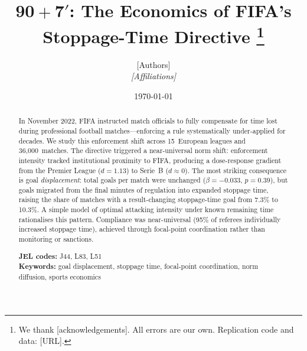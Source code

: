 \documentclass[12pt]{article}
\title{\textbf{$\boldsymbol{90{+}7'}$: The Economics of
FIFA's Stoppage-Time Directive}%
\thanks{We thank [acknowledgements]. All errors are our own.
Replication code and data: [URL].}}
\author{[Authors]\\[4pt]\textit{[Affiliations]}}
\date{\today}
\begin{document}
\maketitle


\begin{abstract}
\noindent
In November 2022, FIFA instructed match officials to fully compensate
for time lost during professional football matches---enforcing a rule
systematically under-applied for decades. We study this enforcement
shift across 15~European leagues and 36,000~matches. The directive
triggered a near-universal norm shift: enforcement intensity tracked
institutional proximity to FIFA, producing a dose-response gradient
from the Premier League ($d = 1.13$) to Serie~B ($d \approx 0$).
The most striking consequence is goal \textit{displacement}: total
goals per match were unchanged ($\beta = -0.033$, $p = 0.39$), but
goals migrated from the final minutes of regulation into expanded
stoppage time, raising the share of matches with a result-changing
stoppage-time goal from 7.3\% to 10.3\%. A simple model of optimal
attacking intensity under known remaining time rationalises this
pattern. Compliance was near-universal (95\% of referees individually
increased stoppage time), achieved through focal-point coordination
rather than monitoring or sanctions.

\medskip
\noindent
\textbf{JEL codes:} J44, L83, L51 \\
\textbf{Keywords:} goal displacement, stoppage time, focal-point
coordination, norm diffusion, sports economics
\end{abstract}

\newpage

















\begin{appendices}

\end{appendices}


\clearpage



\newpage

\end{document}
